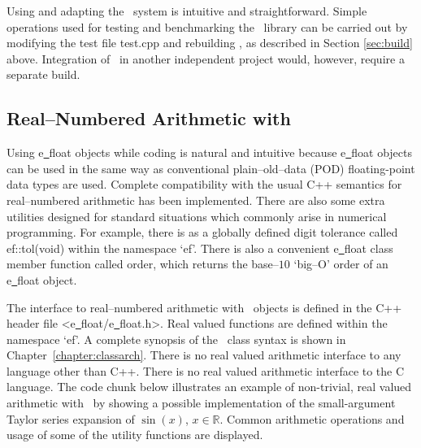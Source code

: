 Using and adapting the \efloat\ system is intuitive and straightforward.
Simple operations used for testing and benchmarking the \efloat\
library can be carried out by modifying the test file {\courier test.cpp}
and rebuilding \efloat, as described in Section \ref{sec:build} above.
Integration of \efloat\ in another independent project would, however,
require a separate build.

\subsection{Real--Numbered Arithmetic with \efloathyperref}

Using {\courier e\underline\ float} objects while coding is natural and
intuitive because {\courier e\underline\ float} objects can be used in
the same way as conventional plain--old--data (POD) floating-point data
types are used. Complete compatibility with the usual C++ semantics for
real--numbered arithmetic has been implemented.
There are also some extra utilities designed for standard situations
which commonly arise in numerical programming. For example, there is as a
globally defined digit tolerance called {\courier ef::tol(void)} within
the name\-space `{\courier ef}'. There is also a convenient
{\courier e\underline\ float} class member function called {\courier order},
which returns the base--$10$ `{big--O}' order of an
{\courier e\underline\ float} object.

The interface to real--numbered arithmetic with \efloat\ objects
is defined in the C++ header file
{\courier <e\underline\ float/e\underline\ float.h>}.
Real valued functions are defined within the name\-space `{\courier ef}'.
A complete synopsis of the \efloat\ class syntax is shown
in Chapter~\ref{chapter:classarch}.
There is no real valued arithmetic interface to any language other than C++.
There is no real valued arithmetic interface to the C language.
The code chunk below illustrates an example of non-trivial,
real valued arithmetic with \efloat\ by showing a possible implementation
of the small-argument Taylor series expansion of $\sin(x)$, $x\in\mathbb{R}$.
Common arithmetic operations and usage of some of the utility functions
are displayed.

\vspace{4.0pt}



\vspace{4.0pt}

